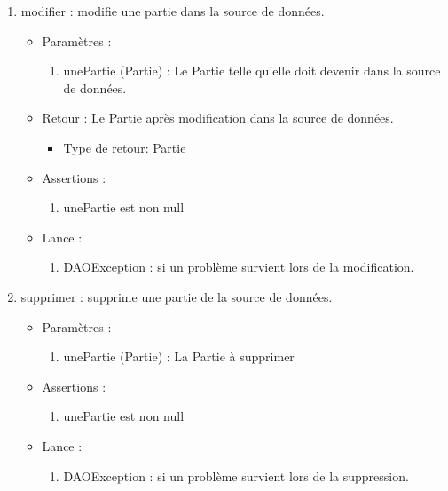 \begin{itemize}
\begin{enumerate}
  \item modifier : modifie une partie dans la source de données.
    \begin{itemize}
    \item Paramètres : 
      \begin{enumerate}
      \item unePartie (Partie) : Le Partie telle qu'elle doit devenir dans la source de données.
      \end{enumerate}
    \item Retour : Le Partie après modification dans la source de données.
      \begin{itemize}
      \item Type de retour: Partie
      \end{itemize}
    \item Assertions : 
      \begin{enumerate}
      \item unePartie est non null
      \end{enumerate}
    \item Lance :
      \begin{enumerate}
      \item DAOException : si un problème survient lors de la modification.
      \end{enumerate}
    \end{itemize}
    
  \item supprimer : supprime une partie de la source de données.
    \begin{itemize}
    \item Paramètres : 
      \begin{enumerate}
      \item unePartie (Partie) : La Partie à supprimer
      \end{enumerate}
    \item Assertions : 
      \begin{enumerate}
      \item unePartie est non null
      \end{enumerate}
    \item Lance :
      \begin{enumerate}
      \item DAOException : si un problème survient lors de la suppression.
      \end{enumerate}
    \end{itemize}


\end{enumerate}
\end{itemize}
